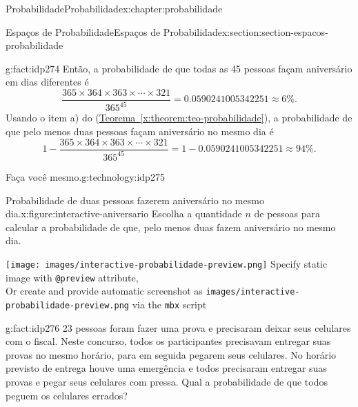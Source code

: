 \documentclass[oneside,10pt,]{book}
\newcommand{\xreffont}{\relax}
\newcommand{\mono}[1]{\texttt{#1}}
\numberwithin{equation}{section}
\newlength{\qrsize}
\newlength{\previewwidth}
\begin{document}
\begin{chapterptx}{Probabilidade}{}{Probabilidade}{}{}{x:chapter:probabilidade}
\begin{sectionptx}{Espaços de Probabilidade}{}{Espaços de Probabilidade}{}{}{x:section:section-espacos-probabilidade}
\begin{fact}{}{}{g:fact:idp274}
Então, a probabilidade de que todas as 45 pessoas façam aniversário em dias diferentes é%
\begin{equation*}
\frac{365\times 364\times 363\times \cdots \times321}{365^{45}}= 0.0590241005342251 \approx 6\%. 
\end{equation*}
Usando o item a) do (\hyperref[x:theorem:teo-probabilidade]{Teorema~{\xreffont\ref{x:theorem:teo-probabilidade}}}), a probabilidade de que pelo menos duas pessoas façam aniversário no mesmo dia é%
\begin{equation*}
1 - \frac{365\times 364\times 363\times \cdots \times321}{365^{45}}= 1-0.0590241005342251 \approx 94\%. 
\end{equation*}
%
\end{fact}
\begin{technology}{Faça você mesmo.}{g:technology:idp275}%
\begin{figureptx}{Probabilidade de duas pessoas fazerem aniversário no mesmo dia.}{x:figure:interactive-aniversario}{}%
\centering
Escolha a quantidade \(n\) de pessoas para calcular a probabilidade de que, pelo menos duas fazem aniversário no mesmo dia.%
\setlength{\qrsize}{9em}
\setlength{\previewwidth}{\linewidth}
\addtolength{\previewwidth}{-\qrsize}
\begin{tcbraster}[raster columns=2, raster column skip=1pt, raster halign=center, raster force size=false, raster left skip=0pt, raster right skip=0pt]%
\begin{tcolorbox}[previewstyle, width=\previewwidth]%
%
{\texttt{[image: images/interactive-probabilidade-preview.png]}}%
{\small{}Specify static image with \mono{@preview} attribute,\\Or create and provide automatic screenshot as \mono{images/interactive-probabilidade-preview.png} via the \mono{mbx} script}%
\end{tcolorbox}%
\begin{tcolorbox}[qrstyle]%
{\hypersetup{urlcolor=black}}%
\end{tcolorbox}%
\end{tcbraster}%
\tcblower
\end{figureptx}%
\end{technology}
\begin{fact}{}{}{g:fact:idp276}%
23 pessoas foram fazer uma prova e precisaram deixar seus celulares com o fiscal. Neste concurso, todos os participantes precisavam entregar suas provas no mesmo horário, para em seguida pegarem seus celulares. No horário previsto de entrega houve uma emergência e todos precisaram entregar suas provas e pegar seus celulares com pressa. Qual a probabilidade de que todos peguem os celulares errados?%

\end{fact}
\end{sectionptx}
\end{chapterptx}
\end{document}
